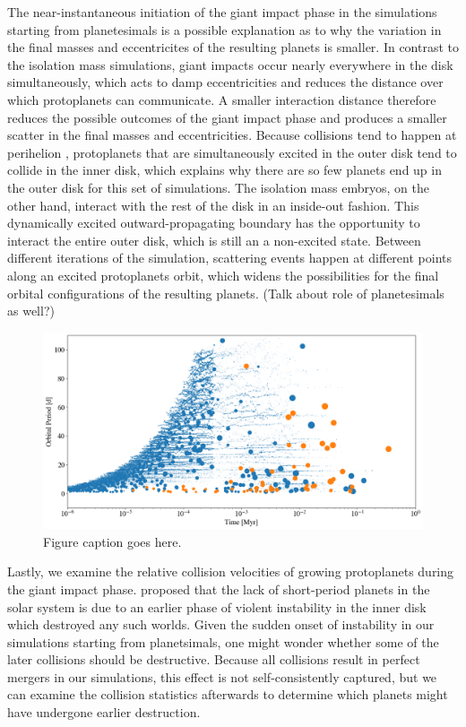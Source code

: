 The near-instantaneous initiation of the giant impact phase in the simulations starting from planetesimals is a possible explanation as to why the variation in the final masses and eccentricites of the resulting planets is smaller. In contrast to the isolation mass simulations, giant impacts occur nearly everywhere in the disk simultaneously, which acts to damp eccentricities and reduces the distance over which protoplanets can communicate. A smaller interaction distance therefore reduces the possible outcomes of the giant impact phase and produces a smaller scatter in the final masses and eccentricities. Because collisions tend to happen at perihelion \cite{levison03}, protoplanets that are simultaneously excited in the outer disk tend to collide in the inner disk, which explains why there are so few planets end up in the outer disk for this set of simulations. The isolation mass embryos, on the other hand, interact with the rest of the disk in an inside-out fashion. This dynamically excited outward-propagating boundary has the opportunity to interact the entire outer disk, which is still an a non-excited state. Between different iterations of the simulation, scattering events happen at different points along an excited protoplanets orbit, which widens the possibilities for the final orbital configurations of the resulting planets. (Talk about role of planetesimals as well?)

\begin{figure}
\begin{center}
    \includegraphics[width=\textwidth]{figures/stip/full_coll_iso_comp.png}
    \caption{Figure caption goes here.\label{fig:full_coll_iso_comp}}
\end{center}
\end{figure}

Lastly, we examine the relative collision velocities of growing protoplanets during the giant impact phase. \cite{volk15} proposed that the lack of short-period planets in the solar system is due to an earlier phase of violent instability in the inner disk which destroyed any such worlds. Given the sudden onset of instability in our simulations starting from planetsimals, one might wonder whether some of the later collisions should be destructive. Because all collisions result in perfect mergers in our simulations, this effect is not self-consistently captured, but we can examine the collision statistics afterwards to determine which planets might have undergone earlier destruction.

